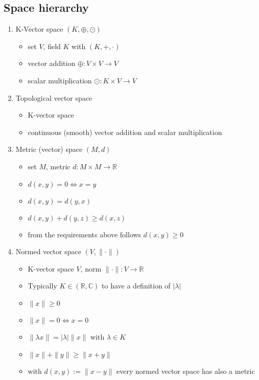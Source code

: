 \documentclass[10pt,a4paper]{article}
\theoremstyle{definition}
\begin{document}
\subsection{Space hierarchy}
\begin{enumerate}
    \item K-Vector space $(K,\oplus,\odot)$ 
        \begin{itemize}
            \item set $V$, field $K$ with $(K,+,\cdot)$
            \item vector addition $\oplus: V\times V\rightarrow V$
            \item scalar multiplication $\odot: K\times V\rightarrow V$
        \end{itemize}
    \item Topological vector space
        \begin{itemize}
            \item K-vector space
            \item continuous (smooth) vector addition and scalar multiplication
        \end{itemize}
    \item Metric (vector) space $(M,d)$
        \begin{itemize}
            \item set $M$, metric $d: M\times M\rightarrow \mathbb{R}$
            \item $d(x,y)=0 \Leftrightarrow x=y$
            \item $d(x,y)=d(y,x)$
            \item $d(x,y)+d(y,z) \ge d(x,z)$
            \item from the requirements above follows $d(x,y)\ge0$
        \end{itemize}
    \item Normed vector space $(V,\|\cdot\|)$
        \begin{itemize}
            \item K-vector space $V$, norm $\|\cdot\|: V\rightarrow \mathbb{R}$
            \item Typically $K\in(\mathbb{R}, \mathbb{C})$ to have a definition of $|\lambda|$
            \item $\|x\|\ge0$
            \item $\|x\|=0 \Leftrightarrow x=0$
            \item $\|\lambda x\|=|\lambda| \|x\|$ with $\lambda\in K$
            \item $\|x\|+\|y\|\ge\|x+y\|$
            \item with $d(x,y):=\|x-y\|$ every normed vector space has also a metric

\end{itemize}
\end{enumerate}
\end{document}
